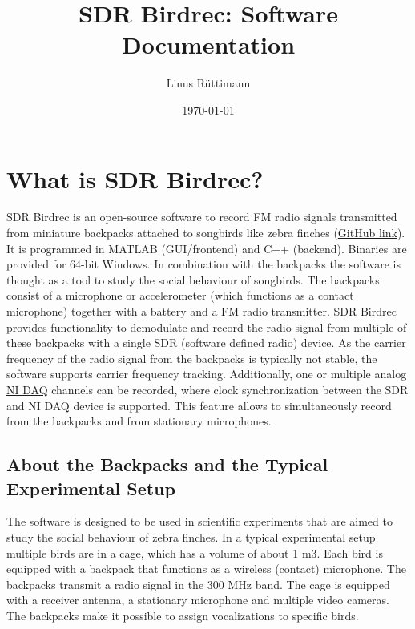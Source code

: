 \documentclass[10pt]{article}
\begin{document}
\title{SDR Birdrec: Software Documentation}



\author[1]{Linus Rüttimann}%
%


\vspace{-1em}



  \date{\today}


\begingroup
\let\center\flushleft
\let\endcenter\endflushleft
\maketitle
\endgroup









\section{What is SDR Birdrec?}

SDR Birdrec is an open-source software to record FM radio signals
transmitted from miniature backpacks attached to songbirds like zebra
finches (\href{https://github.com/rlinus/SdrBirdrec}{GitHub link}). It
is programmed in MATLAB (GUI/frontend) and C++ (backend). Binaries are
provided for 64-bit Windows. In combination with the backpacks the
software is thought as a tool to study the social behaviour of
songbirds. The backpacks consist of a microphone or accelerometer (which
functions as a contact microphone) together with a battery and a FM
radio transmitter. SDR Birdrec provides functionality to demodulate and
record the radio signal from multiple of these backpacks with a single
SDR (software defined radio) device. As the carrier frequency of the
radio signal from the backpacks is typically not stable, the software
supports carrier frequency tracking. Additionally, one or multiple
analog \href{http://www.ni.com/data-acquisition/}{NI DAQ} channels can
be recorded, where clock synchronization between the SDR and NI DAQ
device is supported. This feature allows to simultaneously record from
the backpacks and from stationary microphones.

\subsection{About the Backpacks and the Typical Experimental Setup
\label{backpack_and_exp_setup}}

The software is designed to be used in scientific experiments that are
aimed to study the social behaviour of zebra finches. In a typical
experimental setup multiple birds are in a cage, which has a volume of
about 1 m3. Each bird is equipped with a backpack that functions as a
wireless (contact) microphone. The backpacks transmit a radio signal in
the 300 MHz band. The cage is equipped with a receiver antenna, a
stationary microphone and multiple video cameras. The backpacks make it
possible to assign vocalizations to specific birds.
\end{document}
